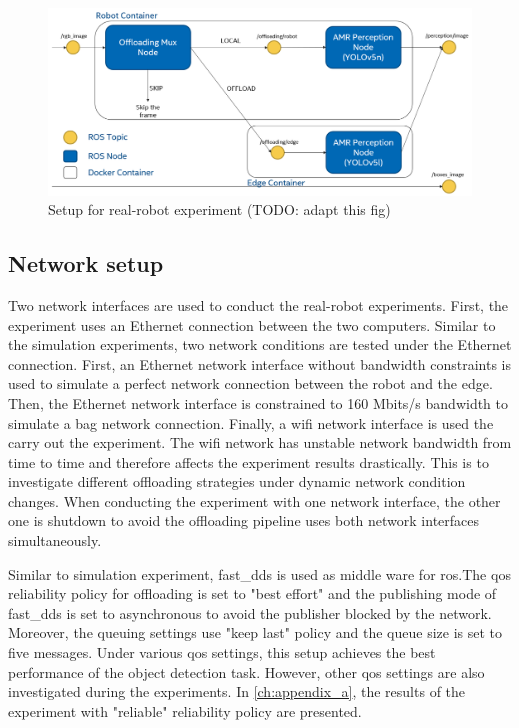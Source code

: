 \begin{figure}
    \centering
    \includegraphics[width=\linewidth]{figures/setup/general_setup.png}  %
    \caption{Setup for real-robot experiment (TODO: adapt this fig)}  %
    \label{fig:real_robot_experiment_setup}  %
\end{figure}


\subsection{Network setup}

Two network interfaces are used to conduct the real-robot experiments. First, the experiment uses an Ethernet connection between the two computers. Similar to the simulation experiments, two network conditions are tested under the Ethernet connection. First, an Ethernet network interface without bandwidth constraints is used to simulate a perfect network connection between the robot and the edge. Then, the Ethernet network interface is constrained to 160 Mbits/s bandwidth to simulate a bag network connection. Finally, a \gls{wifi} network interface is used the carry out the experiment. The \gls{wifi} network has unstable network bandwidth from time to time and therefore affects the experiment results drastically. This is to investigate different offloading strategies under dynamic network condition changes. When conducting the experiment with one network interface, the other one is shutdown to avoid the offloading pipeline uses both network interfaces simultaneously. 

Similar to simulation experiment, \gls{fast_dds} is used as middle ware for \gls{ros}.The \gls{qos} reliability policy for offloading is set to "best effort" and the publishing mode of \gls{fast_dds} is set to asynchronous to avoid the publisher blocked by the network. Moreover, the queuing settings use "keep last" policy and the queue size is set to five messages. Under various \gls{qos} settings, this setup achieves the best performance of the object detection task. However, other \gls{qos} settings are also investigated during the experiments. In \cref{ch:appendix_a}, the results of the experiment with "reliable" reliability policy are presented. 

